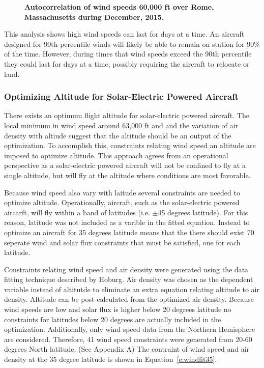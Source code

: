 \documentclass[]{aiaa-tc}%
\begin{document}
\begin{figure}[H]
 \begin{subfigmatrix}{2}%
 \end{subfigmatrix}
 \caption{\textbf{Autocorrelation of wind speeds 60,000 ft over Rome, Massachusetts during December, 2015. }}
 \label{f:romewinds}
\end{figure}

This analysis shows high wind speeds can last for days at a time.  
An aircraft designed for 90th percentile winds will likely be able to remain on station for 90\% of the time.  
However, during times that wind speeds exceed the 90th percentile they could last for days at a time, possibly requiring the aircraft to relocate or land. 

\subsubsection{Optimizing Altitude for Solar-Electric Powered Aircraft}

There exists an optimum flight altitude for solar-electric powered aircraft.  
The local minimum in wind speed around 63,000 ft and and the variation of air density with altiude suggest that the altitude should be an output of the optimization. 
To accomplish this, constraints relating wind speed an altitude are imposed to optimize altitude. 
This approach agrees from an operational perspective as a solar-electric powered aircraft will not be confined to fly at a single altitude, but will fly at the altitude where conditions are most favorable. 

Because wind speed also vary with laitude several constraints are needed to optimize altitude. 
Operationally, aircraft, such as the solar-electric powered aircarft, will fly within a band of latitudes (i.e. $\pm$45 degrees latitude).  
For this reason, latitude was not included as a varible in the fitted equation.  
Instead to optimize an aircraft for 35 degrees latitude means that the there should exist 70 seperate wind and solar flux constraints that must be satisfied, one for each latitude.

Constraints relating wind speed and air density were generated using the data fitting technique described by Hoburg\cite{fitting}.
Air density was chosen as the dependent variable instead of altitutde to eliminate an extra equation relating altitude to air density. 
Altitude can be post-calculated from the optimized air density. 
Because wind speeds are low and solar flux is higher below 20 degrees latitude no constraints for latitudes below 20 degrees are actually included in the optimization. 
Additionally, only wind speed data from the Northern Hemisphere are considered.
Therefore, 41 wind speed constraints were generated from 20-60 degrees North latitude. (See Appendix A) 
The contraint of wind speed and air density at the 35 degree latitude is shown in Equation~\eqref{e:windfit35}.
\end{document}
